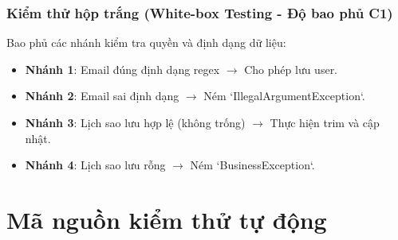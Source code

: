 \documentclass[12pt]{extreport}
\begin{document}
\subsubsection{Kiểm thử hộp trắng (White-box Testing - Độ bao phủ C1)}
Bao phủ các nhánh kiểm tra quyền và định dạng dữ liệu:
\begin{itemize}
    \item \textbf{Nhánh 1}: Email đúng định dạng regex $\rightarrow$ Cho phép lưu user.
    \item \textbf{Nhánh 2}: Email sai định dạng $\rightarrow$ Ném `IllegalArgumentException`.
    \item \textbf{Nhánh 3}: Lịch sao lưu hợp lệ (không trống) $\rightarrow$ Thực hiện trim và cập nhật.
    \item \textbf{Nhánh 4}: Lịch sao lưu rỗng $\rightarrow$ Ném `BusinessException`.
\end{itemize}

\section{Mã nguồn kiểm thử tự động}
\end{document}
